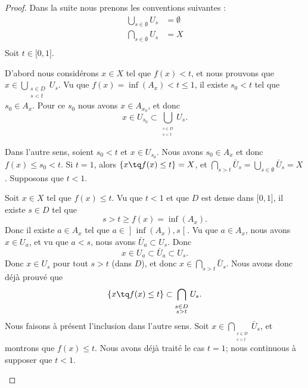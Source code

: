 \begin{proof}
    Dans la suite nous prenons les conventions suivantes :
    \begin{subequations}
        \begin{align}
            \bigcup_{s\in\emptyset}U_s&=\emptyset\\
            \bigcap_{s\in\emptyset}U_s&=X\\
        \end{align}
    \end{subequations}
    Soit \( t\in\mathopen[ 0 , 1 \mathclose]\).
    \begin{subproof}
        \spitem[\( \{ x\tq f(x)<t \}=\bigcup_{s<t}U_s\)]
        D'abord nous considérons \( x\in X\) tel que \( f(x)<t\), et nous prouvons que $x\in\bigcup_{\substack{s\in D\\s<t}}U_s$. Vu que \( f(x)=\inf(A_x)<t\leq 1\), il existe \( s_0<t\) tel que \( s_0\in A_x\). Pour ce \( s_0\) nous avons \( x\in A_{x_0}\), et donc
        \begin{equation}
            x\in U_{s_0}\subset\bigcup_{_{\substack{s\in D\\s<t}}}U_s.
        \end{equation}
        
        Dans l'autre sens, soient \( s_0<t\) et \( x\in U_{s_0}\). Nous avons \( s_0\in A_x\) et donc \( f(x)\leq s_0<t\).
        \spitem[\( \{ x\tq f(x)\leq t \}=\bigcup_{s>t}\bar U_s\)]
        Si \( t=1\), alors \( \{ x\tq f(x)\leq t \}=X\), et \( \bigcap_{s>t}\bar U_s=\bigcup_{s\in\emptyset}\bar U_s=X\). Supposons que \( t<1\).

        Soit \( x\in X\) tel que \( f(x)\leq t\). Vu que \( t<1\) et que \( D\) est dense dans \( \mathopen[ 0 , 1 \mathclose]\), il existe \( s\in D\) tel que
        \begin{equation}
            s>t\geq f(x)=\inf(A_x).
        \end{equation}
        Donc il existe \( a\in A_x\) tel que \( a\in\mathopen] \inf(A_x) , s \mathclose[\). Vu que \( a\in A_x\), nous avons \( x\in U_a\), et vu que \( a<s\), nous avons \( \bar U_a\subset U_s\). Donc
        \begin{equation}
            x\in U_a\subset\bar U_a\subset U_s.
        \end{equation}
        Donc \( x\in U_s\) pour tout \( s>t\) (dans \( D\)), et donc \( x\in\bigcap_{s>t}\bar U_s\). Nous avons donc déjà prouvé que
        \begin{equation}
            \{ x\tq f(x)\leq t \}\subset\bigcap_{_{\substack{s\in D\\s>t}}}U_s.
        \end{equation}
        Nous faisons à présent l'inclusion dans l'autre sens. Soit \( x\in \bigcap_{_{\substack{x\in D\\s>t}}}\bar U_s\), et montrons que \( f(x)\leq t\). Nous avons déjà traité le cas \( t=1\); nous continuous à supposer que \( t<1\). 


\end{subproof}
\end{proof}
